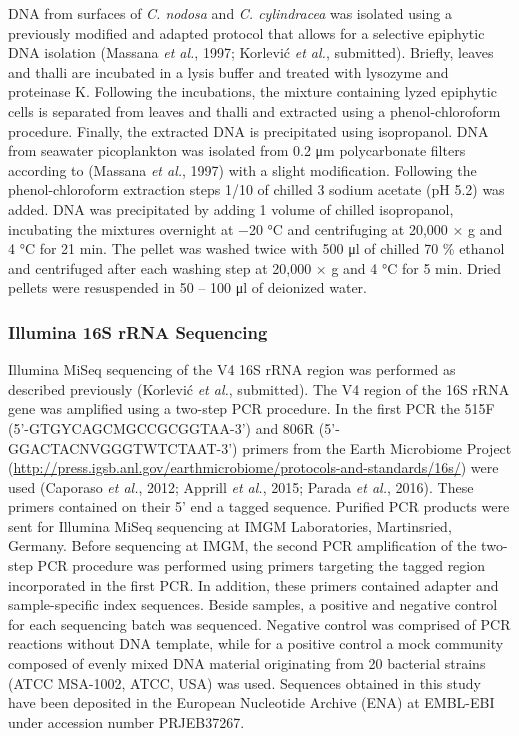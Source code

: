\documentclass[12pt,]{article}
\begin{document}
DNA from surfaces of \emph{C. nodosa} and \emph{C. cylindracea} was
isolated using a previously modified and adapted protocol that allows
for a selective epiphytic DNA isolation (Massana \emph{et al.}, 1997;
Korlević \emph{et al.}, submitted). Briefly, leaves and thalli are
incubated in a lysis buffer and treated with lysozyme and proteinase K.
Following the incubations, the mixture containing lyzed epiphytic cells
is separated from leaves and thalli and extracted using a
phenol-chloroform procedure. Finally, the extracted DNA is precipitated
using isopropanol. DNA from seawater picoplankton was isolated from 0.2
\si{\um} polycarbonate filters according to (Massana \emph{et al.},
1997) with a slight modification. Following the phenol-chloroform
extraction steps 1/10 of chilled 3 \si{\Molar} sodium acetate (pH 5.2)
was added. DNA was precipitated by adding 1 volume of chilled
isopropanol, incubating the mixtures overnight at \num{-20}
\si{\degreeCelsius} and centrifuging at 20,000 × g and 4
\si{\degreeCelsius} for 21 \si{\minute}. The pellet was washed twice
with 500 \si{\ul} of chilled 70 \si{\percent} ethanol and centrifuged
after each washing step at 20,000 × g and 4 \si{\degreeCelsius} for 5
\si{\minute}. Dried pellets were resuspended in 50 -- 100 \si{\ul} of
deionized water.

\hypertarget{illumina-16s-rrna-sequencing}{%
\subsubsection{Illumina 16S rRNA
Sequencing}\label{illumina-16s-rrna-sequencing}}

Illumina MiSeq sequencing of the V4 16S rRNA region was performed as
described previously (Korlević \emph{et al.}, submitted). The V4 region
of the 16S rRNA gene was amplified using a two-step PCR procedure. In
the first PCR the 515F (5'-GTGYCAGCMGCCGCGGTAA-3') and 806R
(5'-GGACTACNVGGGTWTCTAAT-3') primers from the Earth Microbiome Project
(\url{http://press.igsb.anl.gov/earthmicrobiome/protocols-and-standards/16s/})
were used (Caporaso \emph{et al.}, 2012; Apprill \emph{et al.}, 2015;
Parada \emph{et al.}, 2016). These primers contained on their 5' end a
tagged sequence. Purified PCR products were sent for Illumina MiSeq
sequencing at IMGM Laboratories, Martinsried, Germany. Before sequencing
at IMGM, the second PCR amplification of the two-step PCR procedure was
performed using primers targeting the tagged region incorporated in the
first PCR. In addition, these primers contained adapter and
sample-specific index sequences. Beside samples, a positive and negative
control for each sequencing batch was sequenced. Negative control was
comprised of PCR reactions without DNA template, while for a positive
control a mock community composed of evenly mixed DNA material
originating from 20 bacterial strains (ATCC MSA-1002, ATCC, USA) was
used. Sequences obtained in this study have been deposited in the
European Nucleotide Archive (ENA) at EMBL-EBI under accession number
PRJEB37267.
\end{document}
